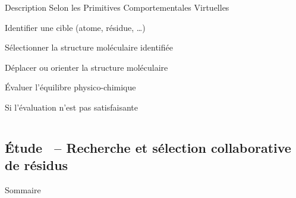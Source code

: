 \documentclass[english,french,dvips,10pt]{mybeamer}
\begin{document}
\begin{myframe}
\begin{columns}[T]
{\begin{column}{0.5\textwidth}
					\begin{myblock}{Description}%
						Selon les Primitives Comportementales Virtuelles %
						\begin{description}%
							\item<2->[Recherche] Identifier une cible (atome, résidue, \dots)%
							\item<3->[Sélection] Sélectionner la structure moléculaire identifiée%
							\item<4->[Manipulation] Déplacer ou orienter la structure moléculaire%
							\item<5->[Évaluation] Évaluer l'équilibre physico-chimique%
							\item<6->[Recommencer] Si l'évaluation n'est pas satisfaisante%
						\end{description}%
					\end{myblock}%
				\end{column}%
			}
		\end{columns}
	\end{myframe}
	\subsection{Étude~ -- Recherche et sélection collaborative de résidus}
	\begin{myframe}{Sommaire}
		\tableofcontents[sectionstyle=show/shaded,subsectionstyle=show/shaded/hide,subsubsectionstyle=show/show/hide]
	\end{myframe}
\end{document}
